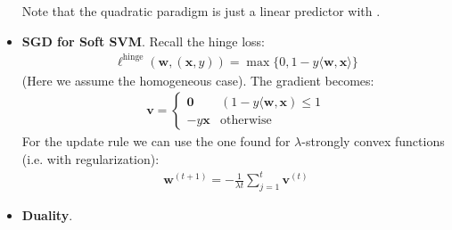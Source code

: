 \documentclass[../template.tex]{subfiles}
\begin{document}
\begin{itemize}
    Note that the quadratic paradigm is just a linear predictor with .

    \item \textbf{SGD for Soft SVM}.  Recall the hinge loss:
    \begin{align*}
        \ell^{\mathrm{hinge}}(\bm{w}, (\bm{x}, y)) = \max\{0, 1- y \langle \bm{w}, \bm{x} \rangle\}
    \end{align*}
    (Here we assume the homogeneous case). The gradient becomes:
    \begin{align*}
        \bm{v} = \begin{cases}
            \bm{0} & (1- y \langle \bm{w}, \bm{x}) \leq 1\\
            -y \bm{x} & \text{otherwise}
        \end{cases}
    \end{align*}
    For the update rule we can use the one found for $\lambda$-strongly convex functions (i.e. with regularization):
    \begin{align*}
        \bm{w}^{(t+1)} = -\frac{1}{\lambda t} \sum_{j=1}^{t} \bm{v}^{(t)} 
    \end{align*}
    \item \textbf{Duality}.  
\end{itemize}
\end{document}
